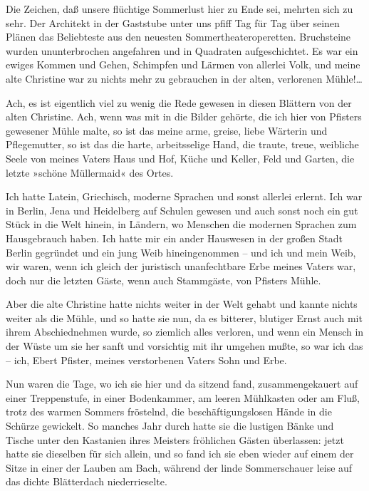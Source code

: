 Die Zeichen, daß unsere flüchtige Sommerlust hier zu Ende sei,
mehrten sich zu sehr. Der Architekt in der Gaststube unter uns
pfiff Tag für Tag über seinen Plänen das Beliebteste aus den
neuesten Sommertheateroperetten. Bruchsteine wurden ununterbrochen
angefahren und in Quadraten aufgeschichtet. Es war ein ewiges
Kommen und Gehen, Schimpfen und Lärmen von allerlei Volk, und meine
alte Christine war zu nichts mehr zu gebrauchen in der alten,
verlorenen Mühle!\ldots{}

Ach, es ist eigentlich viel zu wenig die Rede gewesen in diesen
Blättern von der alten Christine. Ach, wenn was mit in die Bilder
gehörte, die ich hier von Pfisters gewesener Mühle malte, so ist
das meine arme, greise, liebe Wärterin und Pflegemutter, so ist das
die harte, arbeitsselige Hand, die traute, treue, weibliche Seele
von meines Vaters Haus und Hof, Küche und Keller, Feld und Garten,
die letzte »schöne Müllermaid« des Ortes.

Ich hatte Latein, Griechisch, moderne Sprachen und sonst allerlei
erlernt. Ich war in Berlin, Jena und Heidelberg auf Schulen gewesen
und auch sonst noch ein gut Stück in die Welt hinein, in Ländern,
wo Menschen die modernen Sprachen zum Hausgebrauch haben. Ich hatte
mir ein ander Hauswesen in der großen Stadt Berlin gegründet und
ein jung Weib hineingenommen – und ich und mein Weib, wir waren,
wenn ich gleich der juristisch unanfechtbare Erbe meines Vaters
war, doch nur die letzten Gäste, wenn auch Stammgäste, von Pfisters
Mühle.

Aber die alte Christine hatte nichts weiter in der Welt gehabt und
kannte nichts weiter als die Mühle, und so hatte sie nun, da es
bitterer, blutiger Ernst auch mit ihrem Abschiednehmen wurde, so
ziemlich alles verloren, und wenn ein Mensch in der Wüste um sie
her sanft und vorsichtig mit ihr umgehen mußte, so war ich das –
ich, Ebert Pfister, meines verstorbenen Vaters Sohn und Erbe.

Nun waren die Tage, wo ich sie hier und da sitzend fand,
zusammengekauert auf einer Treppenstufe, in einer Bodenkammer, am
leeren Mühlkasten oder am Fluß, trotz des warmen Sommers fröstelnd,
die beschäftigungslosen Hände in die Schürze gewickelt. So manches
Jahr durch hatte sie die lustigen Bänke und Tische unter den
Kastanien ihres Meisters fröhlichen Gästen überlassen: jetzt hatte
sie dieselben für sich allein, und so fand ich sie eben wieder auf
einem der Sitze in einer der Lauben am Bach, während der linde
Sommerschauer leise auf das dichte Blätterdach niederrieselte.

